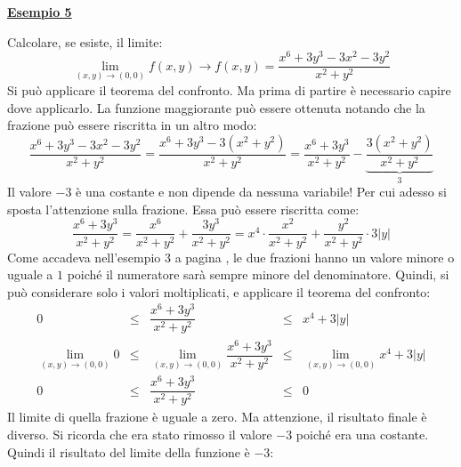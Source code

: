 \documentclass[a4paper]{article}
\newcommand{\example}[1]{\textcolor{Green4}{\textbf{#1}}}
\begin{document}
	\begin{flushleft}
		\example{\underline{Esempio 5}}
	\end{flushleft}
	Calcolare, se esiste, il limite:
	\begin{equation*}
		\displaystyle\lim_{\left(x,y\right) \rightarrow \left(0,0\right)} f\left(x,y\right) \rightarrow f\left(x,y\right) = \dfrac{
				x^{6} + 3y^{3} - 3x^{2} - 3y^{2}
			}{x^{2}+y^{2}}
	\end{equation*}
	Si può applicare il teorema del confronto. Ma prima di partire è necessario capire dove applicarlo. La funzione maggiorante può essere ottenuta notando che la frazione può essere riscritta in un altro modo:
	\begin{equation*}
		\dfrac{
				x^{6} + 3y^{3} - 3x^{2} - 3y^{2}
		}{x^{2}+y^{2}}
		=
		\dfrac{
			x^{6} + 3y^{3} -3 \left(x^{2} + y^{2}\right)
		}{x^{2}+y^{2}} =
		\dfrac{x^{6} + 3y^{3}}{x^{2}+y^{2}} - \underbrace{\dfrac{3 \left(x^{2} + y^{2}\right)}{x^{2}+y^{2}}}_{3}
	\end{equation*}
	Il valore $-3$ è una costante e non dipende da nessuna variabile! Per cui adesso si sposta l'attenzione sulla frazione. Essa può essere riscritta come:
	\begin{equation*}
		\dfrac{x^{6} + 3y^{3}}{x^{2}+y^{2}} = \dfrac{x^{6}}{x^{2}+y^{2}} + \dfrac{3y^{3}}{x^{2}+y^{2}} = x^{4} \cdot \dfrac{x^{2}}{x^{2}+y^{2}} + \dfrac{y^{2}}{x^{2}+y^{2}} \cdot 3|y|
	\end{equation*}
	Come accadeva nell'esempio 3 a pagina \pageref{limiti: esempio 3}, le due frazioni hanno un valore minore o uguale a $1$ poiché il numeratore sarà sempre minore del denominatore. Quindi, si può considerare solo i valori moltiplicati, e applicare il teorema del confronto:
	\begin{equation*}
		\begin{array}{rcccl}
			0 
			&\le& 
			\dfrac{x^{6} + 3y^{3}}{x^{2}+y^{2}}
			&\le& x^{4} + 3|y| \\ [1.5em]
			\displaystyle\lim_{\left(x,y\right)\rightarrow\left(0,0\right)} 0 
			&\le& 
			\displaystyle\lim_{\left(x,y\right)\rightarrow\left(0,0\right)} \dfrac{x^{6} + 3y^{3}}{x^{2}+y^{2}}
			&\le& 
			\displaystyle\lim_{\left(x,y\right)\rightarrow\left(0,0\right)} x^{4} + 3|y| \\ [1.5em]
			0 &\le& \dfrac{x^{6} + 3y^{3}}{x^{2}+y^{2}} &\le& 0
		\end{array}
	\end{equation*}
	Il limite di quella frazione è uguale a zero. Ma attenzione, il risultato finale è diverso. Si ricorda che era stato rimosso il valore $-3$ poiché era una costante. Quindi il risultato del limite della funzione è $-3$:
\end{document}
